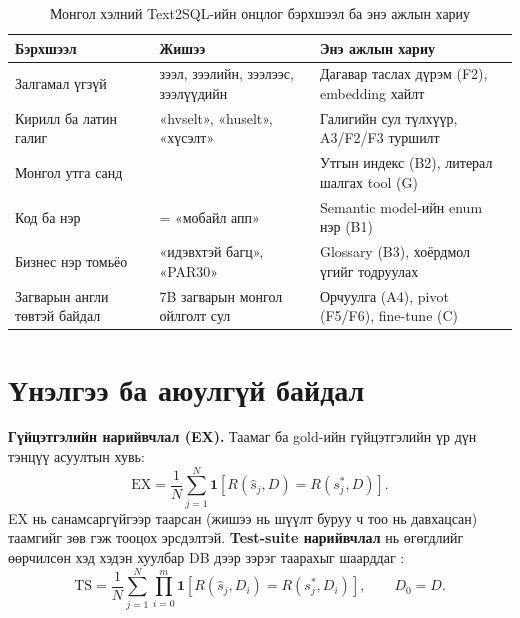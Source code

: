 \begin{table}[H]
\centering\small
\caption{Монгол хэлний Text2SQL-ийн онцлог бэрхшээл ба энэ ажлын хариу}
\label{tab:mn-challenges}
\begin{tabularx}{\textwidth}{>{\raggedright\arraybackslash}p{3.2cm}LL}
\toprule
Бэрхшээл & Жишээ & Энэ ажлын хариу \\
\midrule
Залгамал үгзүй & зээл, зээлийн, зээлээс, зээлүүдийн & Дагавар таслах дүрэм (F2), embedding хайлт \\
Кирилл ба латин галиг & «hvselt», «huselt», «хүсэлт» & Галигийн сул түлхүүр, A3/F2/F3 туршилт \\
Монгол утга санд &  & Утгын индекс (B2), литерал шалгах tool (G) \\
Код ба нэр &  = «мобайл апп» & Semantic model-ийн enum нэр (B1) \\
Бизнес нэр томьёо & «идэвхтэй багц», «PAR30» & Glossary (B3), хоёрдмол үгийг тодруулах \\
Загварын англи төвтэй байдал & 7B загварын монгол ойлголт сул & Орчуулга (A4), pivot (F5/F6), fine-tune (C) \\
\bottomrule
\end{tabularx}
\end{table}

\section{Үнэлгээ ба аюулгүй байдал}
\label{sec:eval-theory}

\textbf{Гүйцэтгэлийн нарийвчлал (EX).} Таамаг ба gold-ийн гүйцэтгэлийн үр дүн тэнцүү асуултын хувь:
\begin{equation}
\mathrm{EX} = \frac{1}{N}\sum_{j=1}^{N} \mathbf{1}\!\left[R(\hat{s}_j, D) = R(s^{\ast}_j, D)\right].
\label{eq:ex}
\end{equation}
EX нь санамсаргүйгээр таарсан (жишээ нь шүүлт буруу ч тоо нь давхацсан) таамгийг зөв гэж тооцох эрсдэлтэй.
\textbf{Test-suite нарийвчлал} нь өгөгдлийг өөрчилсөн хэд хэдэн хуулбар DB дээр зэрэг таарахыг шаарддаг
\cite{zhong_2020_test_suite}:
\begin{equation}
\mathrm{TS} = \frac{1}{N}\sum_{j=1}^{N} \prod_{i=0}^{m} \mathbf{1}\!\left[R(\hat{s}_j, D_i) = R(s^{\ast}_j, D_i)\right],
\qquad D_0 = D.
\label{eq:ts}
\end{equation}

